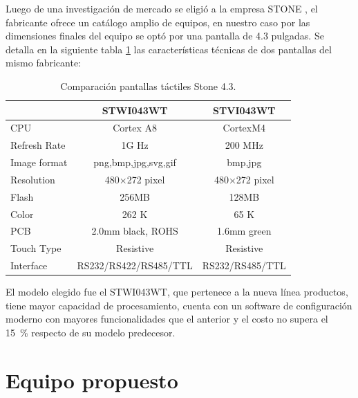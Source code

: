 Luego de una investigación de mercado se eligió a la empresa STONE \citep{web_stone}, el fabricante ofrece un catálogo amplio de equipos, en nuestro caso por las dimensiones finales del equipo se optó por una pantalla de 4.3 pulgadas. Se detalla en la siguiente tabla \ref{tab:tabla_stone} las características técnicas de dos pantallas del mismo fabricante:


\begin{table}[ht]
	\centering
	\caption[Comparación Stone]{Comparación pantallas táctiles Stone 4.3.}
	\begin{tabular}{l c c }    
		\toprule
		\textbf{}     & \textbf{STWI043WT} & \textbf{STVI043WT} \\
		\midrule
		CPU 			& 	Cortex A8         		& 	CortexM4 			 	\\		
		Refresh Rate    & 	1G Hz         			& 	200 MHz 				\\
		Image format  	& 	png,bmp,jpg,svg,gif     & 	bmp,jpg 				\\
		Resolution		& 	480×272 pixel	        & 	480×272 pixel 			\\
		Flash  			& 	256MB         			& 	128MB 					\\
		Color  			& 	262 K	          		& 	65 K 					\\
		PCB 			& 	2.0mm black, ROHS       & 	1.6mm green 			\\
		Touch Type		& 	Resistive    			& 	Resistive				\\
		Interface 		& 	RS232/RS422/RS485/TTL   & 	RS232/RS485/TTL			\\
		\bottomrule
		\hline
	\end{tabular}
	\label{tab:tabla_stone}
\end{table}

El modelo elegido fue el STWI043WT, que pertenece a la nueva línea productos, tiene mayor capacidad de procesamiento, cuenta con un software de configuración moderno con mayores funcionalidades que el anterior y el costo no supera el \SI{15}{\percent} respecto de su modelo predecesor.  




\section{Equipo propuesto}
